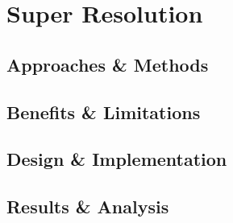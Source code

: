 \chapter{Super Resolution}
\label{chapterlabel5}
\section{Approaches \& Methods}
\section{Benefits \& Limitations}
\section{Design \& Implementation}
\section{Results \& Analysis}
